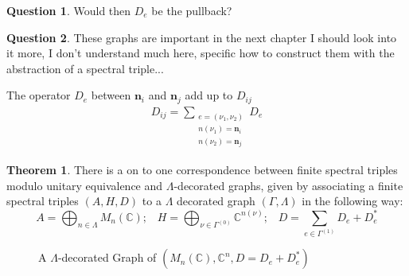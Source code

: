 \documentclass[a4paper]{article}
\theoremstyle{definition}
\theoremstyle{definition}
\newtheorem{question}{Question}
\theoremstyle{definition}
\theoremstyle{theorem}
\newtheorem{theorem}{Theorem}
\theoremstyle{theorem}
\theoremstyle{theorem}
\theoremstyle{definition}
\begin{document}
\begin{question}
    Would then $D_e$ be the pullback?
\end{question}
\begin{question}
    These graphs are important in the next chapter I should look
    into it more, I don't understand much here, specific
    how to construct them with the abstraction of a spectral triple...
\end{question}

The operator $D_e$ between $\textbf{n}_i$ and $\textbf{n}_j$ add up to
$D_{ij}$
\begin{align*}
    D_{ij} = \sum\limits_{\substack{e = (\nu _1, \nu _2) \\ n(\nu _1) =
    \textbf{n}_i \\ n(\nu _2) = \textbf{n}_j}} D_e
\end{align*}

\begin{theorem}
    There is a on to one correspondence between finite spectral triples
    modulo unitary equivalence and $\Lambda$-decorated graphs, given by
    associating a finite spectral triples $(A, H, D)$ to  a $\Lambda$ decorated
    graph $(\Gamma, \Lambda)$ in the following way:
    \begin{equation}
        A = \bigoplus _{n\in \Lambda} M_n(\mathbb{C}); \;\;\;
        H = \bigoplus _{\nu \in \Gamma ^{(0)}} \mathbb{C}^{n(\nu)}; \;\;\;
        D = \sum _{e \in \Gamma ^{(1)}} D_e + D_e^*
    \end{equation}
\end{theorem}
    \begin{figure}[h!]
    \centering
    \caption{A $\Lambda$-decorated Graph of $(M_n(\mathbb{C}), \mathbb{C}^n,
    D = D_e + D_e^*)$}
\end{figure}
\end{document}
